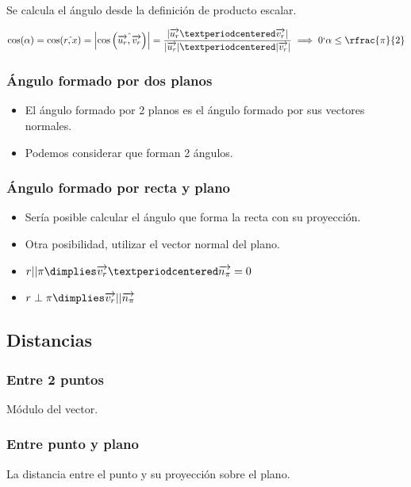 Se calcula el ángulo desde la definición de producto escalar.

\[
\cos(\alpha) = \cos(\hat{r,x}) = \left| \cos\left(\hat{\vec{u_r},\vec{v_r}}\right)\right| = \frac{|\vec{u_r}·\vec{v_r}|}{|\vec{u_r}|·|\vec{v_r}|} \implies 0\lq \alpha \leq \rfrac{\pi}{2}
\]

\subsubsection{Ángulo formado por dos planos}

\begin{itemize}
  \item El ángulo formado por 2 planos es el ángulo formado por sus vectores normales. 
  \item Podemos considerar que forman 2 ángulos.
\end{itemize}

\subsubsection{Ángulo formado por recta y plano}


\begin{itemize}
  \item Sería posible calcular el ángulo que forma la recta con su proyección. 
  \item Otra posibilidad, utilizar el vector normal del plano.
\end{itemize}


\begin{itemize}
  \item $r || \pi \dimplies \vec{v_r}·\vec{n_{\pi}} = 0$
  \item $r\perp \pi \dimplies \vec{v_r}||\vec{n_{\pi}}$
\end{itemize}

\subsection{Distancias}
\subsubsection{Entre 2 puntos}
Módulo del vector.

\subsubsection{Entre punto y plano}
La distancia entre el punto y su proyección sobre el plano.

